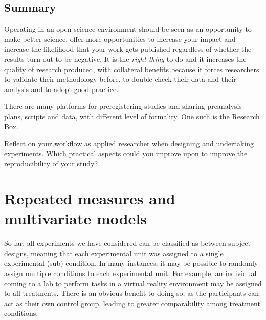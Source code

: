 \documentclass[
  11pt,
  letterpaper,
]{scrbook}
\theoremstyle{definition}
\theoremstyle{remark}
\begin{document}
\hypertarget{summary-3}{%
\section{Summary}\label{summary-3}}

Operating in an open-science environment should be seen as an
opportunity to make better science, offer more opportunities to increase
your impact and increase the likelihood that your work gets published
regardless of whether the results turn out to be negative. It is the
\emph{right thing} to do and it increases the quality of research
produced, with collateral benefits because it forces researchers to
validate their methodology before, to double-check their data and their
analysis and to adopt good practice.

There are many platforms for preregistering studies and sharing
preanalysis plans, scripts and data, with different level of formality.
One such is the \href{https://researchbox.org/}{Research Box}.

\begin{tcolorbox}[enhanced jigsaw, title=\textcolor{quarto-callout-tip-color}{\faLightbulb}\hspace{0.5em}{Your turn}, bottomtitle=1mm, opacitybacktitle=0.6, colframe=quarto-callout-tip-color-frame, leftrule=.75mm, coltitle=black, colbacktitle=quarto-callout-tip-color!10!white, colback=white, toprule=.15mm, rightrule=.15mm, breakable, bottomrule=.15mm, opacityback=0, toptitle=1mm, titlerule=0mm, arc=.35mm, left=2mm]

Reflect on your workflow as applied researcher when designing and
undertaking experiments. Which practical aspects could you improve upon
to improve the reproducibility of your study?

\end{tcolorbox}


\hypertarget{repeated-measures-and-multivariate-models}{%
\chapter{Repeated measures and multivariate
models}\label{repeated-measures-and-multivariate-models}}

So far, all experiments we have considered can be classified as
between-subject designs, meaning that each experimental unit was
assigned to a single experimental (sub)-condition. In many instances, it
may be possible to randomly assign multiple conditions to each
experimental unit. For example, an individual coming to a lab to perform
tasks in a virtual reality environment may be assigned to all
treatments. There is an obvious benefit to doing so, as the participants
can act as their own control group, leading to greater comparability
among treatment conditions.
\end{document}
